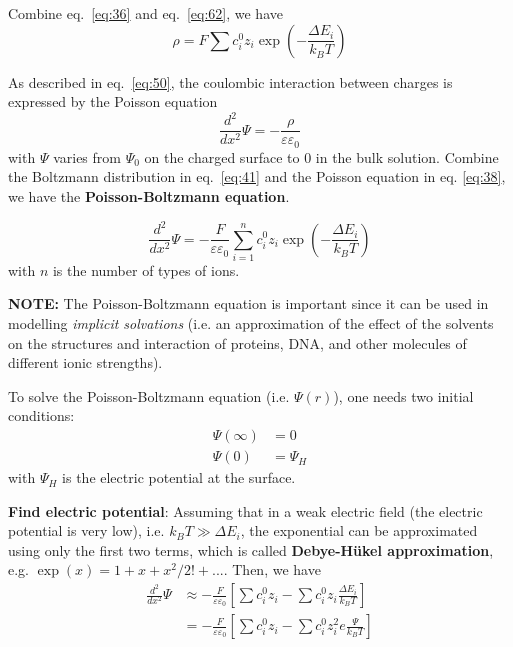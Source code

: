 Combine eq.~\eqref{eq:36} and eq.~\eqref{eq:62}, we have
\begin{equation}
  \label{eq:41}
  \rho = F\sum c_i^0 z_i \exp(-\frac{\Delta E_i}{k_BT})
\end{equation}


As described in eq.~\eqref{eq:50}, the coulombic interaction between
charges is expressed by the Poisson equation
\begin{equation}
  \label{eq:38}
  \frac{d^2}{dx^2}\Psi = -\frac{\rho}{\varepsilon \varepsilon_0}
\end{equation}
with $\Psi$ varies from $\Psi_0$ on the charged surface to 0 in the
bulk solution. Combine the Boltzmann distribution in eq.~\eqref{eq:41}
and the Poisson equation in eq. \eqref{eq:38}, we have the
{\bf Poisson-Boltzmann equation}.

\begin{equation}
  \label{eq:53}
  \frac{d^2}{dx^2}\Psi = -\frac{F}{\varepsilon
    \varepsilon_0}\sum_{i=1}^{n} c_i^0 z_i  \exp(-\frac{\Delta E_i}{k_BT})
\end{equation}
with $n$ is the number of types of ions.

{\bf NOTE:} The Poisson-Boltzmann equation is important since it can
be used in modelling {\it implicit solvations} (i.e. an approximation
of the effect of the solvents on the structures and interaction of
proteins, DNA, and other molecules of different ionic strengths).

To solve the Poisson-Boltzmann equation (i.e. $\Psi(r)$), one needs
two initial conditions:
\begin{equation}
  \begin{split}
    \Psi(\infty) &= 0\\
    \Psi(0) &= \Psi_H
  \end{split}
\end{equation}
with $\Psi_H$ is the electric potential at the surface.



{\bf Find electric potential}: Assuming that in a weak electric field
(the electric potential is very low), i.e. $k_BT\gg \Delta E_i$, the
exponential can be approximated using only the first two terms, which
is called {\bf Debye-H\"ukel approximation}, e.g. $\exp(x) = 1 + x +
x^2/2!+...$. Then, we have
\begin{equation}
  \label{eq:54}
\begin{split}
  \frac{d^2}{dx^2}\Psi &\approx
  -\frac{F}{\varepsilon \varepsilon_0}\left[\sum c_i^0 z_i  -\sum
    c_i^0z_i \frac{\Delta E_i}{k_BT} \right] \\
 &=  -\frac{F}{\varepsilon \varepsilon_0}\left[\sum c_i^0 z_i  -\sum
    c_i^0z_i^2e \frac{\Psi}{k_BT} \right] 
\end{split}
\end{equation}

